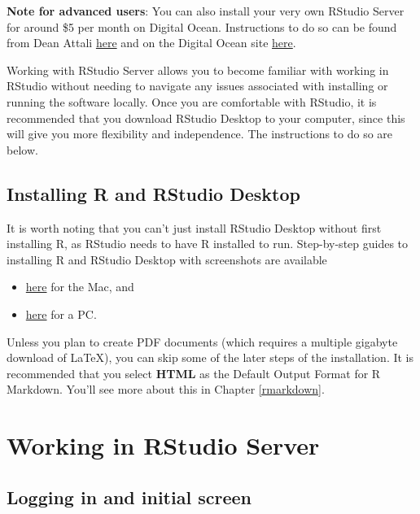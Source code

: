 \documentclass[]{tufte-book}
\providecommand{\tightlist}{%
  \setlength{\itemsep}{0pt}\setlength{\parskip}{0pt}}
\begin{document}
\textbf{Note for advanced users}: You can also install your very own RStudio Server for around \$5 per month on Digital Ocean. Instructions to do so can be found from Dean Attali \href{http://deanattali.com/2015/05/09/setup-rstudio-shiny-server-digital-ocean/}{here} and on the Digital Ocean site \href{https://www.digitalocean.com/community/tutorials/how-to-set-up-rstudio-on-an-ubuntu-cloud-server}{here}.

Working with RStudio Server allows you to become familiar with working in RStudio without needing to navigate any issues associated with installing or running the software locally. Once you are comfortable with RStudio, it is recommended that you download RStudio Desktop to your computer, since this will give you more flexibility and independence. The instructions to do so are below.

\subsection{Installing R and RStudio Desktop}\label{installing-r-and-rstudio-desktop}

It is worth noting that you can't just install RStudio Desktop without first installing R, as RStudio needs to have R installed to run. Step-by-step guides to installing R and RStudio Desktop with screenshots are available

\begin{itemize}
\tightlist
\item
  \href{http://www.reed.edu/data-at-reed/software/R/r_studio.html}{here} for the Mac, and
\item
  \href{http://www.reed.edu/data-at-reed/software/R/r_studio_pc.html}{here} for a PC.
\end{itemize}

Unless you plan to create PDF documents (which requires a multiple gigabyte download of LaTeX), you can skip some of the later steps of the installation. It is recommended that you select \textbf{HTML} as the Default Output Format for R Markdown. You'll see more about this in Chapter \ref{rmarkdown}.

\section{Working in RStudio Server}\label{working-in-rstudio-server}

\subsection{Logging in and initial screen}\label{logging-in-and-initial-screen}
\end{document}
